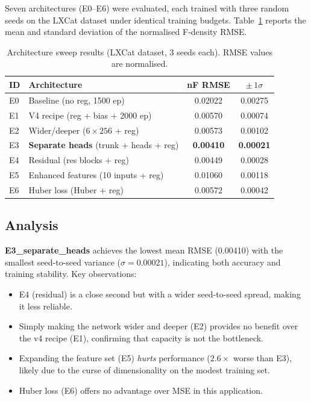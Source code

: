 \documentclass[12pt,a4paper]{article}
\begin{document}
Seven architectures (E0--E6) were evaluated, each trained with three
random seeds on the LXCat dataset under identical training budgets.
Table~\ref{tab:arch_sweep} reports the mean and standard deviation
of the normalised F-density RMSE.

\begin{table}[H]
  \centering
  \caption{Architecture sweep results (LXCat dataset, 3 seeds each).
           RMSE values are normalised.}
  \label{tab:arch_sweep}
  \begin{tabular}{llcc}
    \toprule
    ID & Architecture & nF RMSE & $\pm\,1\sigma$ \\
    \midrule
    E0 & Baseline (no reg, 1500 ep)
       & 0.02022 & 0.00275 \\
    E1 & V4 recipe (reg + bias + 2000 ep)
       & 0.00570 & 0.00074 \\
    E2 & Wider/deeper ($6\times256$ + reg)
       & 0.00573 & 0.00102 \\
    E3 & \textbf{Separate heads} (trunk + heads + reg)
       & \textbf{0.00410} & \textbf{0.00021} \\
    E4 & Residual (res blocks + reg)
       & 0.00449 & 0.00028 \\
    E5 & Enhanced features (10 inputs + reg)
       & 0.01060 & 0.00118 \\
    E6 & Huber loss (Huber + reg)
       & 0.00572 & 0.00042 \\
    \bottomrule
  \end{tabular}
\end{table}

\subsection{Analysis}

\textbf{E3\_separate\_heads} achieves the lowest mean RMSE (0.00410)
with the smallest seed-to-seed variance ($\sigma = 0.00021$),
indicating both accuracy and training stability.  Key observations:
\begin{itemize}
  \item E4 (residual) is a close second but with a wider seed-to-seed
        spread, making it less reliable.
  \item Simply making the network wider and deeper (E2) provides no
        benefit over the v4 recipe (E1), confirming that capacity is
        not the bottleneck.
  \item Expanding the feature set (E5) \emph{hurts} performance
        ($2.6\times$ worse than E3), likely due to the curse of
        dimensionality on the modest training set.
  \item Huber loss (E6) offers no advantage over MSE in this
        application.
\end{itemize}
\end{document}
